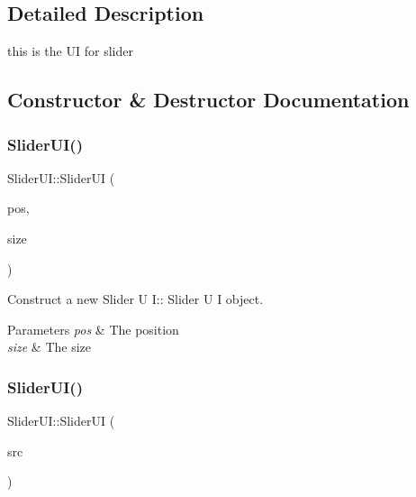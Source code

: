 \subsection{Detailed Description}
this is the UI for slider 

\subsection{Constructor \& Destructor Documentation}
\mbox{\label{class_slider_u_i_a53ec86dc88ad99b9c9d6f3e80c198db4}} 
\subsubsection{\texorpdfstring{Slider\+U\+I()}{SliderUI()}\hspace{0.1cm}{\footnotesize\ttfamily [1/2]}}
{\footnotesize\ttfamily Slider\+U\+I\+::\+Slider\+UI (\begin{DoxyParamCaption}\item[{glm\+::vec2}]{pos,  }\item[{glm\+::vec2}]{size }\end{DoxyParamCaption})}



Construct a new Slider U I\+:\+: Slider U I object. 


\begin{DoxyParams}{Parameters}
{\em pos} & The position \\
\hline
{\em size} & The size \\
\hline
\end{DoxyParams}
\mbox{\label{class_slider_u_i_ab9d0d8254c52a745fc80ddecb86fdcc8}} 
\subsubsection{\texorpdfstring{Slider\+U\+I()}{SliderUI()}\hspace{0.1cm}{\footnotesize\ttfamily [2/2]}}
{\footnotesize\ttfamily Slider\+U\+I\+::\+Slider\+UI (\begin{DoxyParamCaption}\item[{\hyperlink{class_slider_u_i}{Slider\+UI} const \&}]{src }\end{DoxyParamCaption})}



